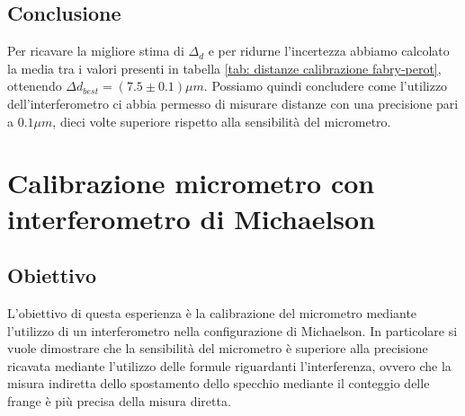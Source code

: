 \documentclass[a4paper]{article}
\begin{document}
\subsection{Conclusione}
Per ricavare la migliore stima di $\Delta_d$ e per ridurne l'incertezza abbiamo calcolato la media tra i valori presenti in tabella \ref{tab: distanze calibrazione fabry-perot}, ottenendo $\Delta d_{best} = (7.5 \pm 0.1) \mu m$. Possiamo quindi concludere come l'utilizzo dell'interferometro ci abbia permesso di misurare distanze con una precisione pari a $0.1 \mu m$, dieci volte superiore rispetto alla sensibilità del micrometro.


\section{Calibrazione micrometro con interferometro di Michaelson}
\subsection{Obiettivo}
L'obiettivo di questa esperienza è la calibrazione del micrometro mediante l'utilizzo di un interferometro nella configurazione di Michaelson. In particolare si vuole dimostrare che la sensibilità del micrometro è superiore alla precisione ricavata mediante l'utilizzo delle formule riguardanti l'interferenza, ovvero che la misura indiretta dello spostamento dello specchio mediante il conteggio delle frange è più precisa della misura diretta.
\end{document}
